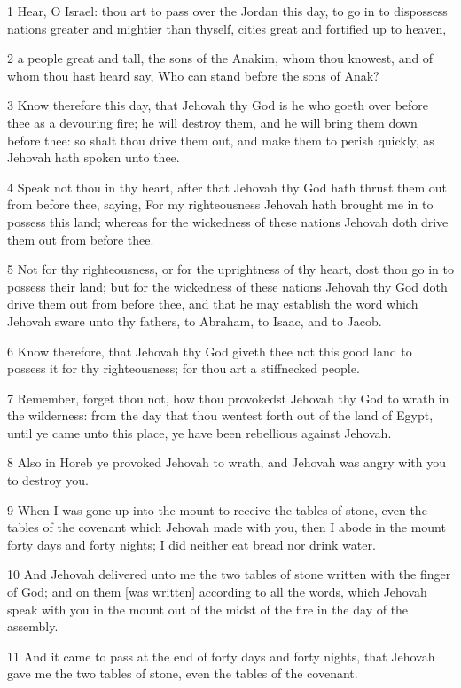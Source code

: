 \par 1 Hear, O Israel: thou art to pass over the Jordan this day, to go in to dispossess nations greater and mightier than thyself, cities great and fortified up to heaven,
\par 2 a people great and tall, the sons of the Anakim, whom thou knowest, and of whom thou hast heard say, Who can stand before the sons of Anak?
\par 3 Know therefore this day, that Jehovah thy God is he who goeth over before thee as a devouring fire; he will destroy them, and he will bring them down before thee: so shalt thou drive them out, and make them to perish quickly, as Jehovah hath spoken unto thee.
\par 4 Speak not thou in thy heart, after that Jehovah thy God hath thrust them out from before thee, saying, For my righteousness Jehovah hath brought me in to possess this land; whereas for the wickedness of these nations Jehovah doth drive them out from before thee.
\par 5 Not for thy righteousness, or for the uprightness of thy heart, dost thou go in to possess their land; but for the wickedness of these nations Jehovah thy God doth drive them out from before thee, and that he may establish the word which Jehovah sware unto thy fathers, to Abraham, to Isaac, and to Jacob.
\par 6 Know therefore, that Jehovah thy God giveth thee not this good land to possess it for thy righteousness; for thou art a stiffnecked people.
\par 7 Remember, forget thou not, how thou provokedst Jehovah thy God to wrath in the wilderness: from the day that thou wentest forth out of the land of Egypt, until ye came unto this place, ye have been rebellious against Jehovah.
\par 8 Also in Horeb ye provoked Jehovah to wrath, and Jehovah was angry with you to destroy you.
\par 9 When I was gone up into the mount to receive the tables of stone, even the tables of the covenant which Jehovah made with you, then I abode in the mount forty days and forty nights; I did neither eat bread nor drink water.
\par 10 And Jehovah delivered unto me the two tables of stone written with the finger of God; and on them [was written] according to all the words, which Jehovah speak with you in the mount out of the midst of the fire in the day of the assembly.
\par 11 And it came to pass at the end of forty days and forty nights, that Jehovah gave me the two tables of stone, even the tables of the covenant.
